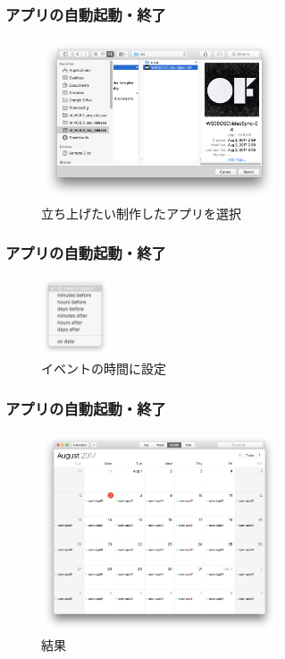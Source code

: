 \documentclass[10pt, dvipdfmx]{beamer}
\begin{document}
        \begin{frame}
            \frametitle{アプリの自動起動・終了}
                \begin{figure}[htb]
                    \includegraphics[width=70mm]{images/app-7.png}
                    \caption{立ち上げたい制作したアプリを選択}
                    \label{fig:14}
                \end{figure}
        \end{frame}

        \begin{frame}
            \frametitle{アプリの自動起動・終了}
                \begin{figure}[htb]
                    \includegraphics[width=20mm]{images/app-8.png}
                    \caption{イベントの時間に設定}
                    \label{fig:15}
                \end{figure}
        \end{frame}

        \begin{frame}
            \frametitle{アプリの自動起動・終了}
                \begin{figure}[htb]
                    \includegraphics[width=70mm]{images/app-9.png}
                    \caption{結果}
                    \label{fig:16}
                \end{figure}
        \end{frame}
\end{document}

